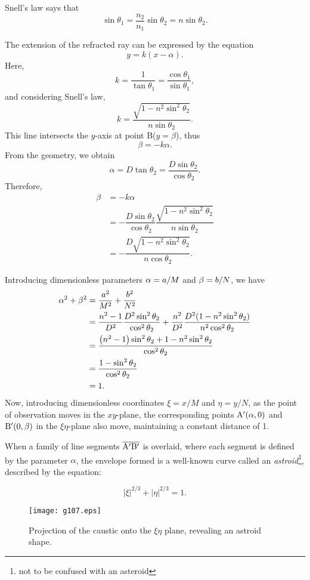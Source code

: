 \documentclass[twocolumn]{article}
\begin{document}
Snell's law says that
$$ \sin\theta_1 = \frac{n_2}{n_1} \sin\theta_2 = n\sin\theta_2.$$

The extension of the refracted ray can be expressed by the equation
$$y=k(x-\alpha).$$
Here, 
$$k=\dfrac{1}{\tan\theta_1}=\dfrac{\cos\theta_1}{\sin\theta_1},$$
and considering Snell's law,
$$k=\dfrac{\sqrt{1-n^2\sin^2\theta_2}}{n\sin\theta_2}.$$
This line intersects the $y$-axis at point B($y=\beta$), thus
$$\beta = -k\alpha.$$
From the geometry, we obtain 
$$\alpha = D\tan\theta_2 = \dfrac{D\sin\theta_2}{\cos\theta_2}.$$
Therefore,
$$\begin{aligned}
	\beta &= -k\alpha \\
	&= -\dfrac{D\sin\theta_2}{\cos\theta_2}
	\dfrac{\sqrt{1-n^2\sin^2\theta_2}}{n\sin\theta_2}\\
	&=-\dfrac{D\sqrt{1-n^2\sin^2\theta_2}}{n\cos\theta_2}.
\end{aligned}$$

Introducing dimensionless parameters ${\alpha}={a}/M$ and ${\beta}={b}/N$, we have
$$ \begin{aligned}
	\greeka^2 + \greekb^2 &= \dfrac{\romana^2}{M^2}+\dfrac{\romanb^2}{N^2}\\
	&=\dfrac{n^2-1}{D^2}\dfrac{D^2\sin^2\theta_2}{\cos^2\theta_2}%
	+\dfrac{n^2}{D^2}\dfrac{D^2(1-n^2\sin^2\theta_2)}{n^2\cos^2\theta_2}\\
	&=\dfrac{\left(n^2-1\right)\sin^2\theta_2 + 1-n^2\sin^2\theta_2}
	{\cos^2\theta_2}\\
	&=\dfrac{1-\sin^2\theta_2}{\cos^2\theta_2}\\
	&= 1.
\end{aligned}$$
Now, introducing dimensionless coordinates $\xi=x/M$ and $\eta=y/N$, as the point of observation moves in the $xy$-plane, the corresponding points $\mathrm{{A^{\prime}}}(\alpha, 0)$ and $\mathrm{{B^{\prime}}}(0, \beta)$ in the $\xi\eta$-plane also move, maintaining a constant distance of 1. 

When a family of line segments $\overline{\mathrm{{A^{\prime}}{B^{\prime}}}}$ is overlaid, where each segment is defined by the parameter $\alpha$, the envelope formed is a well-known curve called an \emph{astroid}\footnote{not to be confused with an asteroid}, described by the equation:

$$ \left| \xi \right|^{2/3} + \left| \eta \right|^{2/3} = 1. $$

\begin{figure}[h]
	\centering
	\texttt{[image: g107.eps]}	
	\caption{Projection of the caustic onto the $\xi\eta$ plane, revealing an astroid shape.}
	\label{fig:astroid}
\end{figure}
\end{document}
